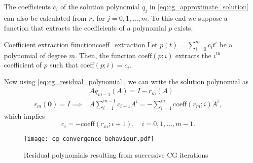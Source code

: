 The coefficients $c_i$ of the solution polynomial $q_j$ in \cref{eq:cg_approximate_solution} can also be calculated from $r_j$ for $j=0,1,\dots,m$. To this end we suppose a function that extracts the coefficients of a polynomial $p$ exists.
\begin{fancydef}{Coefficient extraction function}{coeff_extraction}
  Let $p(t) = \sum_{i=0}^m c_i t^i$ be a polynomial of degree $m$. Then, the function $\text{coeff}(p;i)$ extracts the $i^{\text{th}}$ coefficient of $p$ such that $\text{coeff}(p;i) = c_i$.
\end{fancydef}
Now using \cref{eq:cg_residual_polynomial}, we can write the solution polynomial as
\begin{align*}
                              & Aq_{m-1}(A) = I - r_m(A)                                                  \\
  r_m(\mathbf{0}) = I\implies & A\sum_{i=1}^{m-1} c_{i-1} A^i = -\sum_{i=1}^{m} \text{coeff}(r_m; i) A^i,
\end{align*}
which implies
\begin{equation}
  c_i = -\text{coeff}(r_m; i+1), \quad i = 0, 1, \dots, m-1.
  \label{eq:cg_solution_coefficients}
\end{equation}
\begin{figure}[H]
  \centering
  \texttt{[image: cg\_convergence\_behaviour.pdf]}
  \caption{Residual polynomials resulting from successive CG iterations}
  \label{fig:cg_convergence_behaviour}
\end{figure}

